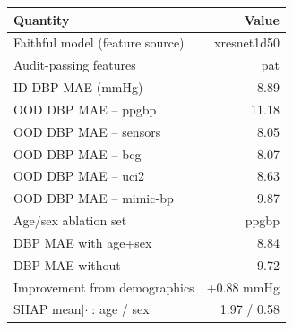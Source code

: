 \begin{tabular}{lr}
\toprule
Quantity & Value \\
\midrule
Faithful model (feature source) & xresnet1d50 \\
Audit-passing features & pat \\
ID DBP MAE (mmHg) & 8.89 \\
OOD DBP MAE -- ppgbp & 11.18 \\
OOD DBP MAE -- sensors & 8.05 \\
OOD DBP MAE -- bcg & 8.07 \\
OOD DBP MAE -- uci2 & 8.63 \\
OOD DBP MAE -- mimic-bp & 9.87 \\
\midrule
Age/sex ablation set & ppgbp \\
DBP MAE with age+sex & 8.84 \\
DBP MAE without & 9.72 \\
Improvement from demographics & +0.88 mmHg \\
SHAP mean$|\cdot|$: age / sex & 1.97 / 0.58 \\
\bottomrule
\end{tabular}